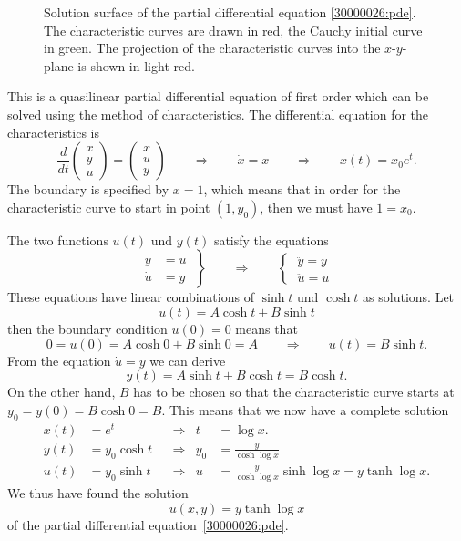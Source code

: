 \begin{loesung}
\begin{figure}
\centering
{}
\caption{Solution surface of the partial differential equation
\eqref{30000026:pde}.
The characteristic curves are drawn in red, the Cauchy initial curve
in green.
The projection of the characteristic curves into the $x$-$y$-plane is
shown in light red.
\label{30000026:fig}}
\end{figure}
This is a quasilinear partial differential equation of first order
which can be solved using the method of characteristics.
The differential equation for the characteristics is
\begin{equation}
\frac{d}{dt}
\begin{pmatrix*}
x\\
y\\
u
\end{pmatrix*}
=
\begin{pmatrix*}
x\\
u\\
y
\end{pmatrix*}
\qquad\Rightarrow\qquad
\dot{x} = x \qquad\Rightarrow\qquad x(t) = x_0e^t.
\end{equation}
The boundary is specified by $x=1$, which means that in order for the 
characteristic curve to start in point $(1,y_0)$, then we must have
$1=x_0$.

The two functions $u(t)$ und $y(t)$ satisfy the equations
\begin{equation}
\left.
\begin{aligned}
\dot{y} &= u \\
\dot{u} &= y
\end{aligned}
\;
\right\}
\qquad\Rightarrow\qquad
\left\{\;
\begin{aligned}
\ddot{y}=y\\
\ddot{u}=u
\end{aligned}
\right.
\label{30000026:chardgl}
\end{equation}
These equations have linear combinations of $\sinh t$ und $\cosh t$
as solutions.
Let
\[
u(t) = A\cosh t + B\sinh t
\]
then the boundary condition $u(0)=0$ means that 
\[
0 = u(0) = A\cosh 0 + B\sinh 0 = A
\qquad\Rightarrow\qquad
u(t) = B\sinh t.
\]
From the equation $\dot{u}=y$ we can derive
\[
y(t) = A\sinh t + B\cosh t = B\cosh t.
\]
On the other hand, $B$ has to be chosen so that the characteristic
curve starts at $y_0 = y(0) = B\cosh 0 = B$.
This means that we now have a complete solution 
\begin{align*}
x(t) &= e^t        &&\Rightarrow&    t &= \log x\bigg.\\
y(t) &= y_0\cosh t &&\Rightarrow&  y_0 &= \frac{y}{\cosh\log x}\\
u(t) &= y_0\sinh t &&\Rightarrow&    u &= \frac{y}{\cosh\log x}\sinh\log x
= y\tanh\log x.
\end{align*}
We thus have found the solution
\begin{equation}
u(x,y) = y\tanh\log x
\label{30000026:eqn:sol}
\end{equation}
of the partial differential equation~\eqref{30000026:pde}.


\end{loesung}
